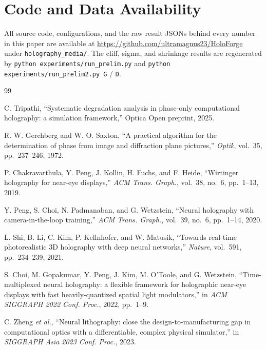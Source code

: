 \documentclass[conference]{IEEEtran}
\begin{document}
\section*{Code and Data Availability}
All source code, configurations, and the raw result JSONs behind every number
in this paper are available at
\url{https://github.com/ultramagnus23/HoloForge} under
\texttt{holography\_media/}. The cliff, sigma, and shrinkage results are
regenerated by \texttt{python experiments/run\_prelim.py} and
\texttt{python experiments/run\_prelim2.py G} / \texttt{D}.


\begin{thebibliography}{99}

C. Tripathi, ``Systematic degradation analysis in phase-only computational
holography: a simulation framework,'' Optica Open preprint, 2025.

R. W. Gerchberg and W. O. Saxton, ``A practical algorithm for the determination
of phase from image and diffraction plane pictures,'' \textit{Optik}, vol.~35,
pp.~237--246, 1972.

P. Chakravarthula, Y. Peng, J. Kollin, H. Fuchs, and F. Heide, ``Wirtinger
holography for near-eye displays,'' \textit{ACM Trans. Graph.}, vol.~38, no.~6,
pp.~1--13, 2019.

Y. Peng, S. Choi, N. Padmanaban, and G. Wetzstein, ``Neural holography with
camera-in-the-loop training,'' \textit{ACM Trans. Graph.}, vol.~39, no.~6,
pp.~1--14, 2020.

L. Shi, B. Li, C. Kim, P. Kellnhofer, and W. Matusik, ``Towards real-time
photorealistic 3D holography with deep neural networks,'' \textit{Nature},
vol.~591, pp.~234--239, 2021.

S. Choi, M. Gopakumar, Y. Peng, J. Kim, M. O'Toole, and G. Wetzstein,
``Time-multiplexed neural holography: a flexible framework for holographic
near-eye displays with fast heavily-quantized spatial light modulators,'' in
\textit{ACM SIGGRAPH 2022 Conf. Proc.}, 2022, pp.~1--9.

C. Zheng \emph{et al.}, ``Neural lithography: close the design-to-manufacturing
gap in computational optics with a differentiable, complex physical
simulator,'' in \textit{SIGGRAPH Asia 2023 Conf. Proc.}, 2023.


\end{thebibliography}
\end{document}
